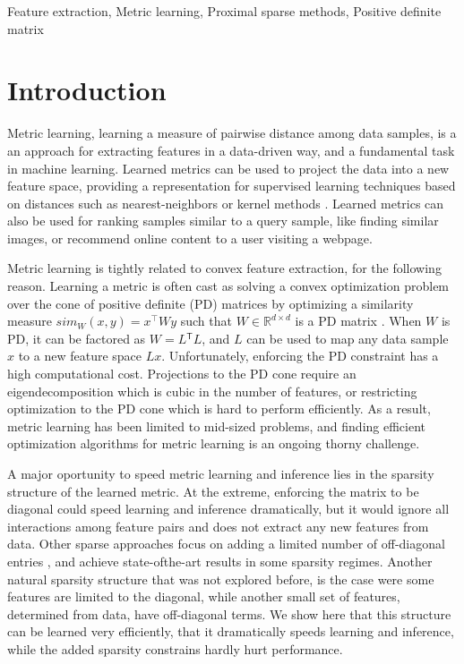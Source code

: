 \documentclass[twoside,11pt]{article}
\newcommand\mat[1]{{#1}}
\newcommand{\T}{{}^\mathsf{T}}
\newcommand{\W}{\mat{W}}
\newcommand{\R}{\mathbb{R}}
\newcommand{\cholL}{\mat{L}}
\begin{document}
\begin{keywords}
  Feature extraction, Metric learning, Proximal sparse methods, Positive definite matrix 
\end{keywords}

\section{Introduction}
Metric learning, learning a measure of pairwise distance among data samples, is a an approach for extracting features in a data-driven way, and a fundamental task in machine learning. Learned metrics can be used to project the data into a new feature space, providing a representation for supervised learning techniques based on distances such as nearest-neighbors or kernel methods \citep{kulis2012survey}.
Learned metrics can also be used for ranking samples similar to a query sample, like finding similar images, or recommend online content to a user visiting a webpage. 

Metric learning is tightly related to convex feature extraction, for the following reason. Learning a metric is often cast as solving a convex optimization problem over the cone of positive definite (PD) matrices by optimizing a similarity measure $sim_W (x,y) = x^\top W y$ such that $W \in \R^{d \times d}$ is a PD matrix  \citep{kulis2012survey,bellet2013survey}. 
When $\W$ is PD, it can be factored as $\W= \cholL\T \cholL$, and $\cholL$ can be used to map any data sample $x$ to a new feature space $\cholL x$. Unfortunately, enforcing the PD constraint has a high computational cost. Projections to the PD cone require an eigendecomposition which is cubic in the number of features, or restricting optimization to the PD cone which is hard to perform efficiently. As a result, metric learning has been limited to mid-sized problems, and finding efficient optimization algorithms for metric learning is an ongoing thorny challenge. 

A major oportunity to speed metric learning and inference lies in the sparsity structure of the learned metric. At the extreme, enforcing the matrix to be diagonal could speed learning and inference dramatically, but it would ignore all interactions among feature pairs and does not extract any new features from  data. Other sparse approaches focus on adding a limited number of off-diagonal entries \citep{HDSL}, and achieve state-ofthe-art results in some sparsity regimes. Another natural sparsity structure that was not explored before, is the case were some features are limited to the diagonal, while another small set of features, determined from data, have off-diagonal terms. We show here that this structure can be learned very efficiently, that it dramatically speeds learning and inference, while the added sparsity constrains hardly hurt performance. 
\end{document}
